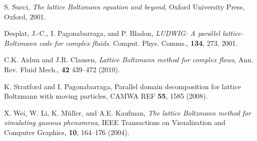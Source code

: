 \begin{thebibliography}{1}




S. Succi, \textit{The lattice Boltzmann equation and beyond},
Oxford University Press, Oxford, 2001.


Desplat, J.-C., I. Pagonabarraga, and P. Bladon,
\textit{LUDWIG: A parallel lattice-Boltzmann code for complex fluids}.
Comput. Phys. Comms., \textbf{134}, 273, 2001.

C.K. Aidun and J.R. Clausen,
\textit{Lattice Boltzmann method for complex flows},
Ann. Rev. Fluid Mech., \textbf{42} 439--472 (2010).




K. Stratford and I. Pagonabarraga,
Parallel domain decomposition for lattice Boltzmann with moving particles,
CAMWA REF \textbf{55}, 1585 (2008).





X. Wei, W. Li, K. M\"uller, and A.E. Kaufman,
\textit{The lattice Boltzmann method for simulating gaseous phenomena},
IEEE Transactions on Visualization and Computer Graphics,
\textbf{10}, 164--176 (2004).


\end{thebibliography}
